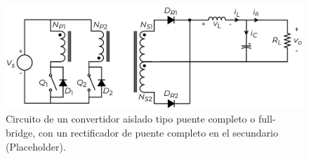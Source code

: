 \begin{figure}[h]
    \centering
    \includegraphics[scale=0.6]{Imagenes/Push-Pull.pdf}
    \caption{Circuito de un convertidor aislado tipo puente completo o full-bridge, con un rectificador de puente completo en el secundario (Placeholder).}
    \label{fullbridge}
\end{figure}

